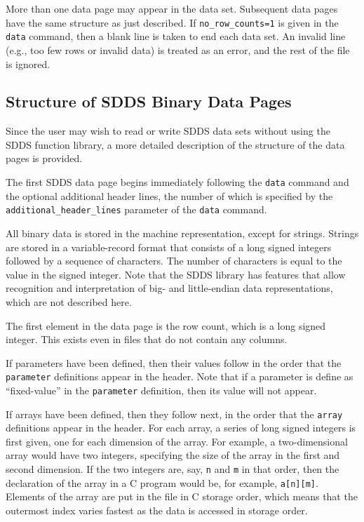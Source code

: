 \documentclass[11pt]{article}
\begin{document}
More than one data page may appear in the data set.  Subsequent data pages have the same structure as just described.
If \verb|no_row_counts=1| is given in the {\tt data} command, then a blank line is taken to end each data set.  An invalid
line (e.g., too few rows or invalid data) is treated as an error, and the rest of the file is ignored.

\subsection{Structure of SDDS Binary Data Pages}

Since the user may wish to read or write SDDS data sets without using the SDDS function library, a more detailed
description of the structure of the data pages is provided. 

The first SDDS data page begins immediately following the {\tt data}
command and the optional additional header lines, the number of which
is specified by the \verb|additional_header_lines| parameter of the
{\tt data} command.

All binary data is stored in the machine representation, except for
strings.  Strings are stored in a variable-record format that consists
of a long signed integers followed by a sequence of characters.  The number
of characters is equal to the value in the signed integer.  Note that
the SDDS library has features that allow recognition and interpretation
of big- and little-endian data representations, which are not described here.

The first element in the data page is the row count, which is a long
signed integer.  This exists even in files that do not contain any
columns.

If parameters have been defined, then their values follow in the order
that the {\tt parameter} definitions appear in the header.  Note that
if a parameter is define as ``fixed-value'' in the {\tt parameter}
definition, then its value will not appear.

If arrays have been defined, then they follow next, in the order that
the {\tt array} definitions appear in the header.  For each array, a
series of long signed integers is first given, one for each dimension
of the array.  For example, a two-dimensional array would have two
integers, specifying the size of the array in the first and second
dimension.  If the two integers are, say, {\tt n} and {\tt m} in that
order, then the declaration of the array in a C program would be, for
example, {\tt a[n][m]}.  Elements of the array are put in the file in
C storage order, which means that the outermost index varies fastest
as the data is accessed in storage order.
\end{document}
